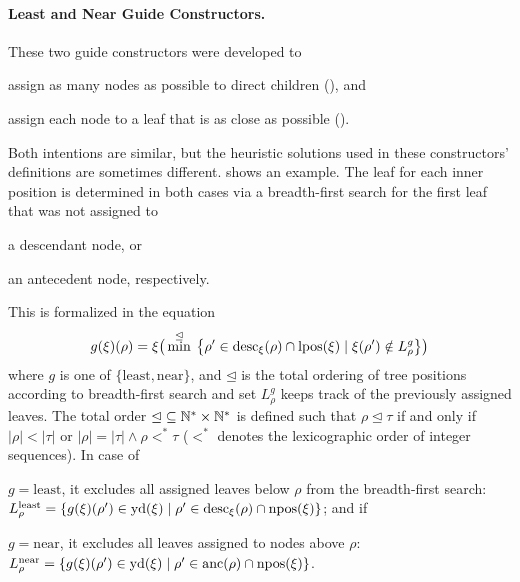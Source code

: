 \documentclass[../../document.tex]{subfiles}
\begin{document}
    \paragraph{Least and Near Guide Constructors.}
    These two guide constructors were developed to
    \begin{inparaenum}
        \item assign as many nodes as possible to direct children (), and
        \item assign each node to a leaf that is as close as possible ().
    \end{inparaenum}
    Both intentions are similar, but the heuristic solutions used in these constructors' definitions are sometimes different.
     shows an example.
    The leaf for each inner position is determined in both cases via a breadth-first search for the first leaf that was not assigned to
    \begin{inparaenum}
        \item a descendant node, or
        \item an antecedent node, respectively.
    \end{inparaenum}
    This is formalized in the equation
    \[
    g(\xi)(\rho) = \xi\big( \min^{\unlhd} \: \big\{\rho' \in \operatorname{desc}_\xi(\rho) \cap \operatorname{lpos}(\xi) \mid \xi(\rho') \notin L^g_\rho \big\} \big)
    \]
    where \(g\) is one of \(\{\mathrm{least}, \mathrm{near}\}\), and \(\unlhd\) is the total ordering of tree positions according to breadth-first search and set \(L^g_\rho\) keeps track of the previously assigned leaves.
    The total order \(\unlhd \subseteq \mathbb{N}^* \times \mathbb{N}^*\) is defined such that \(\rho \unlhd \tau\) if and only if \(|\rho| < |\tau|\) or \(|\rho| = |\tau| \land \rho <^* \tau\) (\(<^*\) denotes the lexicographic order of integer sequences).
    In case of
    \begin{inparaenum}
        \item \(g = \mathrm{least}\), it excludes all assigned leaves below \(\rho\) from the breadth-first search:
        \(L^{\text{least}}_\rho = \{ g(\xi)(\rho') \in \operatorname{yd}(\xi) \mid \rho' \in \operatorname{desc}_\xi(\rho) \cap \operatorname{npos}(\xi) \}\); and if
        \item \(g = \mathrm{near}\), it excludes all leaves assigned to nodes above \(\rho\):
        \(L^{\text{near}}_\rho = \{ g(\xi)(\rho') \in \operatorname{yd}(\xi) \mid \rho' \in \operatorname{anc}(\rho) \cap \operatorname{npos}(\xi) \}\).
    \end{inparaenum}
\end{document}
